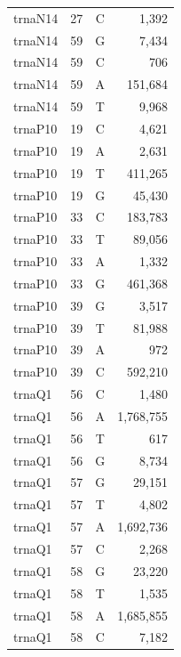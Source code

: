 \documentclass[12pt]{rockefeller}
\begin{document}
\begin{tiny}
\begin{longtable}{|l|r|c|r|}
 trnaN14 &        27 &          C &      1,392 \\
 trnaN14 &        59 &          G &      7,434 \\
 trnaN14 &        59 &          C &        706 \\
 trnaN14 &        59 &          A &    151,684 \\
 trnaN14 &        59 &          T &      9,968 \\
 trnaP10 &        19 &          C &      4,621 \\
 trnaP10 &        19 &          A &      2,631 \\
 trnaP10 &        19 &          T &    411,265 \\
 trnaP10 &        19 &          G &     45,430 \\
 trnaP10 &        33 &          C &    183,783 \\
 trnaP10 &        33 &          T &     89,056 \\
 trnaP10 &        33 &          A &      1,332 \\
 trnaP10 &        33 &          G &    461,368 \\
 trnaP10 &        39 &          G &      3,517 \\
 trnaP10 &        39 &          T &     81,988 \\
 trnaP10 &        39 &          A &        972 \\
 trnaP10 &        39 &          C &    592,210 \\
  trnaQ1 &        56 &          C &      1,480 \\
  trnaQ1 &        56 &          A &  1,768,755 \\
  trnaQ1 &        56 &          T &        617 \\
  trnaQ1 &        56 &          G &      8,734 \\
  trnaQ1 &        57 &          G &     29,151 \\
  trnaQ1 &        57 &          T &      4,802 \\
  trnaQ1 &        57 &          A &  1,692,736 \\
  trnaQ1 &        57 &          C &      2,268 \\
  trnaQ1 &        58 &          G &     23,220 \\
  trnaQ1 &        58 &          T &      1,535 \\
  trnaQ1 &        58 &          A &  1,685,855 \\
  trnaQ1 &        58 &          C &      7,182 \\

\end{longtable}
\end{tiny}
\end{document}
